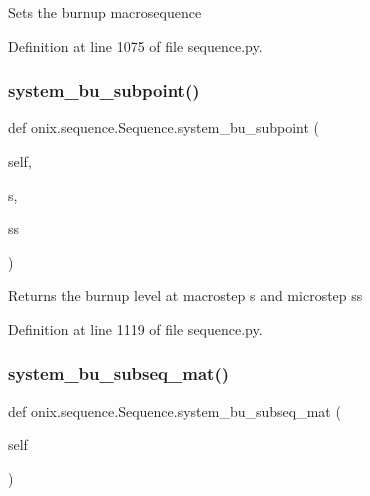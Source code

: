 \begin{DoxyVerb}Sets the burnup macrosequence
\end{DoxyVerb}
 

Definition at line 1075 of file sequence.\+py.

\mbox{\label{classonix_1_1sequence_1_1Sequence_a337a06633a4f3ebc5e04116be4de44f4}} 
\subsubsection{\texorpdfstring{system\+\_\+bu\+\_\+subpoint()}{system\_bu\_subpoint()}}
{\footnotesize\ttfamily def onix.\+sequence.\+Sequence.\+system\+\_\+bu\+\_\+subpoint (\begin{DoxyParamCaption}\item[{}]{self,  }\item[{}]{s,  }\item[{}]{ss }\end{DoxyParamCaption})}

\begin{DoxyVerb}Returns the burnup level at macrostep s and microstep ss\end{DoxyVerb}
 

Definition at line 1119 of file sequence.\+py.

\mbox{\label{classonix_1_1sequence_1_1Sequence_a7b1c3865a12804e84a32a428601afe77}} 
\subsubsection{\texorpdfstring{system\+\_\+bu\+\_\+subseq\+\_\+mat()}{system\_bu\_subseq\_mat()}\hspace{0.1cm}{\footnotesize\ttfamily [1/2]}}
{\footnotesize\ttfamily def onix.\+sequence.\+Sequence.\+system\+\_\+bu\+\_\+subseq\+\_\+mat (\begin{DoxyParamCaption}\item[{}]{self }\end{DoxyParamCaption})}

